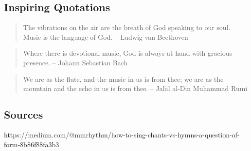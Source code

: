 \documentclass[12pt]{article}
\begin{document}
\subsection*{Inspiring Quotations}

\begin{quote}
  The vibrations on the air are the breath of God speaking to our soul. Music is the language of God. – Ludwig van Beethoven
\end{quote}

\begin{quote}
  Where there is devotional music, God is always at hand with gracious presence. – Johann Sebastian Bach
\end{quote}

\begin{quote}
  We are as the flute, and the music in us is from thee; we are as the mountain and the echo in us is from thee. – Jalāl al-Dīn Muḥammad Rumi
\end{quote}




\subsection*{Sources}

https://medium.com/@mmrhythm/how-to-sing-chants-vs-hymns-a-question-of-form-8b86f88fa3b3
\end{document}
